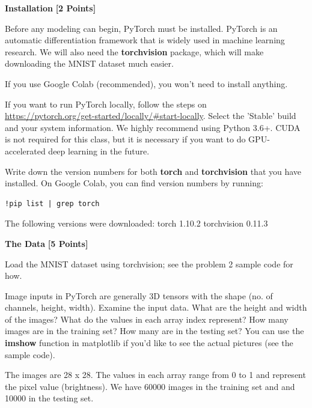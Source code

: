 \medskip

\problem \textbf{Installation} \textbf{[2 Points]}


Before any modeling can begin, PyTorch must be installed. PyTorch is an automatic differentiation framework that is widely used in machine learning research.  We will also need the \textbf{torchvision} package, which will make downloading the MNIST dataset much easier. 

If you use Google Colab (recommended), you won't need to install anything.

If you want to run PyTorch locally, follow the steps on \\
\url{https://pytorch.org/get-started/locally/#start-locally}. Select the 'Stable' build and your system information. We highly recommend using Python 3.6+. CUDA is not required for this class, but it is necessary if you want to do GPU-accelerated deep learning in the future.

Write down the version numbers for both \textbf{torch} and \textbf{torchvision} that you have installed. On Google Colab, you can find version numbers by running: \begin{verbatim}!pip list | grep torch\end{verbatim}

\begin{solution}
 The following versions were downloaded:
 torch                              1.10.2   
 torchvision                        0.11.3 
\end{solution}


\problem \textbf{The Data} \textbf{[5 Points]}

Load the MNIST dataset using torchvision; see the problem 2 sample code for how.

Image inputs in PyTorch are generally 3D tensors with the shape (no. of channels, height, width). Examine the input data. What are the height and width of the images? What do the values in each array index represent?  How many images are in the training set? How many are in the testing set? You can use the \textbf{imshow} function in matplotlib if you'd like to see the actual pictures (see the sample code).

\begin{subsolution}
 The images are 28 x 28. The values in each array range from 0 to 1 and represent the pixel value (brightness). We have 60000 images in the training set and and 10000 in the testing set.
\end{subsolution}

